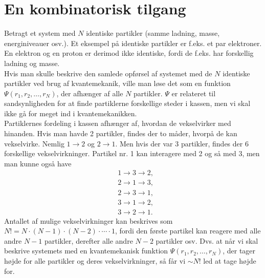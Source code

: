 \section{En kombinatorisk tilgang}
Betragt et system med $N$ identiske partikler (samme ladning, masse, energiniveauer osv.). %
Et eksempel på identiske partikler er f.eks. et par elektroner. En elektron og en proton er derimod ikke identiske, fordi de f.eks. har forskellig ladning og masse.\\[12pt]
Hvis man skulle beskrive den samlede opførsel af systemet med de $N$ identiske partikler ved brug af kvantemekanik, ville man løse det som en funktion $\Psi(r_1,r_2,\dots,r_N)$, der afhænger af alle $N$ partikler. $\Psi$ er relateret til sandsynligheden for at finde partiklerne forskellige steder i kassen, men vi skal ikke gå for meget ind i kvantemekanikken.\\
\indent Partiklernes fordeling i kassen afhænger af, hvordan de vekselvirker med hinanden. Hvis man havde 2 partikler, findes der to måder, hvorpå de kan vekselvirke. Nemlig $1\to 2$ og $2\to 1$. Men hvis der var 3 partikler, findes der 6 forskellige vekselvirkninger. Partikel nr. 1 kan interagere med 2 og så med 3, men man kunne også have
\begin{align*}
    &1\rightarrow3\rightarrow2,\\
    &2\rightarrow1\rightarrow3,\\
    &2\rightarrow3\rightarrow1,\\
    &3\rightarrow1\rightarrow2,\\
    &3\rightarrow2\rightarrow1.
\end{align*}
Antallet af mulige vekselvirkninger kan beskrives som $N! = N\cdot(N-1)\cdot(N-2)\cdot\cdots\cdot 1$, fordi den første partikel kan reagere med alle andre $N-1$ partikler, derefter alle andre $N-2$ partikler osv. Dvs. at når vi skal beskrive systemets med en kvantemekanisk funktion $\Psi(r_1,r_2,\dots,r_N)$, der tager højde for alle partikler og deres vekselvirkninger, så får vi $\sim N!$ led at tage højde for. 
